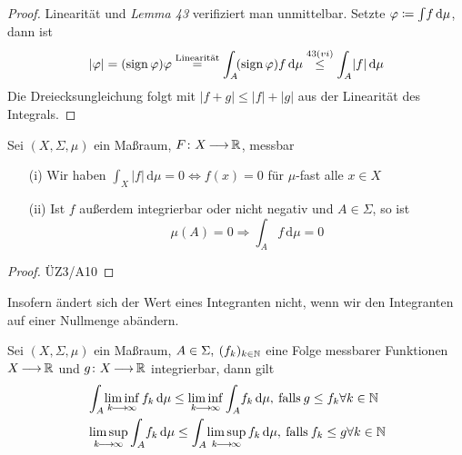 \documentclass[skript.tex]{subfiles}
\begin{document}
			\begin{proof}
				Linearität und \textit{Lemma 43} verifiziert man unmittelbar. Setzte $\varphi\coloneqq\int \! f \, \mathrm{d}\mu$, dann ist
				\begin{equation*}
					|\varphi|= (\operatorname{sign} \varphi)\varphi \stackrel{\text{Linearität}}= \int_A \! (\operatorname{sign} \varphi)f \, \mathrm{d}\mu \stackrel{43(vi)}{\leq} \int_A \! |f| \, \mathrm{d}\mu
				\end{equation*}
				Die Dreiecksungleichung folgt mit $|f+g|\leq|f|+|g|$ aus der Linearität des Integrals.
			\end{proof}

			\begin{lem}
				Sei $(X,\Sigma,\mu)$ ein Maßraum, $F\colon X\kern -1pt \longrightarrow \kern -1pt\mathbb{R}$, messbar
				\begin{itemize}
					\item[(i)] Wir haben $\int_X \! |f| \, \mathrm{d}\mu=0 \Leftrightarrow f(x)=0$ für $\mu$-fast alle $x\in X$
					\item[(ii)] Ist $f$ außerdem integrierbar oder nicht negativ und $A\in\Sigma$, so ist
						\begin{equation*}
							\mu(A)=0 \Rightarrow \int_A \! f \, \mathrm{d}\mu = 0
						\end{equation*}
				\end{itemize}
			\end{lem}

			\begin{proof}
				ÜZ3/A10
			\end{proof}

			Insofern ändert sich der Wert eines Integranten nicht, wenn wir den Integranten auf einer Nullmenge abändern.

			\begin{lem}
				Sei $(X,\Sigma,\mu)$ ein Maßraum, $A\in\Sigma, \: (f_k)_{k\in\mathbb{N}}$ eine Folge messbarer Funktionen $X\kern -1pt \longrightarrow \kern -1pt\mathbb{R}$ und $g\colon X\kern -1pt \longrightarrow \kern -1pt\mathbb{R}$ integrierbar, dann gilt
				\begin{align*}
				&\int_A \! \liminf\limits_{k\kern -1pt \longrightarrow \kern -1pt\infty} f_k \, \mathrm{d}\mu \leq \liminf\limits_{k\kern -1pt \longrightarrow \kern -1pt\infty}\int_A \! f_k \, \mathrm{d}\mu, \: \mathrm{falls} \: g\leq f_k  \forall k\in\mathbb{N} \\
				&\limsup\limits_{k\kern -1pt \longrightarrow \kern -1pt\infty}\int_A \! f_k \, \mathrm{d}\mu \leq \int_A \! \limsup\limits_{k\kern -1pt \longrightarrow \kern -1pt\infty} f_k \, \mathrm{d}\mu, \: \mathrm{falls} \: f_k\leq g \forall k\in\mathbb{N}
				\end{align*}
			\end{lem}
\end{document}
